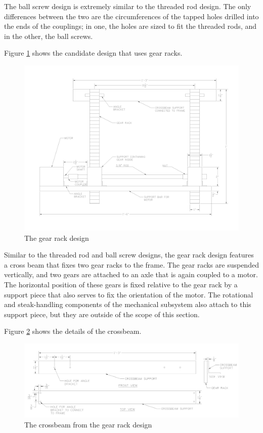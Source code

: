 \documentclass[11pt]{article}
\begin{document}
The ball screw design is extremely similar to the threaded rod design.
The only differences between the two are the circumferences of the tapped holes drilled into the ends of the couplings; in one, the holes are sized to fit the threaded rods, and in the other, the ball screws.

Figure \ref{fig:gear rack} shows the candidate design that uses gear racks.

\begin{figure}[H]
  \centering
  \includegraphics[width=0.6\linewidth]{res/gear_rack.png}
  \caption{The gear rack design}
  \label{fig:gear rack}
\end{figure}

Similar to the threaded rod and ball screw designs, the gear rack design features a cross beam that fixes two gear racks to the frame.
The gear racks are suspended vertically, and two gears are attached to an axle that is again coupled to a motor.
The horizontal position of these gears is fixed relative to the gear rack by a support piece that also serves to fix the orientation of the motor.
The rotational and steak-handling components of the mechanical subsystem also attach to this support piece, but they are outside of the scope of this section.

Figure \ref{fig:gear rack crossbeam} shows the details of the crossbeam.

\begin{figure}[H]
  \centering
  \includegraphics[width=\linewidth]{res/gear_rack_crossbeam.png}
  \caption{The crossbeam from the gear rack design}
  \label{fig:gear rack crossbeam}
\end{figure}
\end{document}
